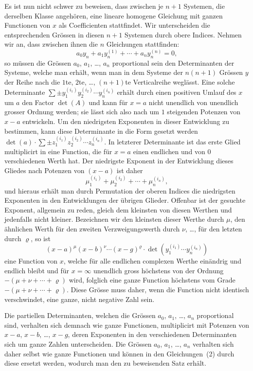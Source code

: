 \documentclass[12pt,a4paper]{article}
\begin{document}
Es ist nun nicht schwer zu beweisen, dass zwischen je $n+1$ Systemen, die derselben Klasse angeh\"oren, eine lineare homogene Gleichung mit ganzen Functionen von $x$ als Coefficienten stattfindet. Wir unterscheiden die entsprechenden Gr\"ossen in diesen $n+1$ Systemen durch obere Indices. Nehmen wir an, dass zwischen ihnen die $n$ Gleichungen stattfinden:
\[
a_0 y_n + a_1 y_n^{(1)} + \cdots + a_n y_n^{(n)} = 0,
\]
so m\"ussen die Gr\"ossen $a_0$, $a_1$, \ldots, $a_n$ proportional sein den Determinanten der Systeme, welche man erh\"alt, wenn man in dem Systeme der $n(n+1)$ Gr\"ossen $y$ der Reihe nach die $1$te, $2$te, \ldots, $(n+1)$te Verticalreihe wegl\"asst. Eine solche Determinante $\sum \pm y_1^{(i_1)} y_2^{(i_2)} \cdots y_n^{(i_n)}$ erh\"alt durch einen positiven Umlauf des $x$ um $a$ den Factor $\det(A)$ und kann f\"ur $x=a$ nicht unendlich von unendlich grosser Ordnung werden; sie l\"asst sich also nach um $1$ steigenden Potenzen von $x-a$ entwickeln. Um den niedrigsten Exponenten in dieser Entwicklung zu bestimmen, kann diese Determinante in die Form gesetzt werden $\det(a) \cdot \sum \pm z_1^{(i_1)} z_2^{(i_2)} \cdots z_n^{(i_n)}$. In letzterer Determinante ist das erste Glied multiplicirt in eine Function, die f\"ur $x=a$ einen endlichen und von $0$ verschiedenen Werth hat. Der niedrigste Exponent in der Entwicklung dieses Gliedes nach Potenzen von $(x-a)$ ist daher
\[
\mu_1^{(i_1)} + \mu_2^{(i_2)} + \cdots + \mu_n^{(i_n)},
\]
und hieraus erh\"alt man durch Permutation der oberen Indices die niedrigsten Exponenten in den Entwicklungen der \"ubrigen Glieder. Offenbar ist der gesuchte Exponent, allgemein zu reden, gleich dem kleinsten von diesen Werthen und jedenfalls nicht kleiner. Bezeichnen wir den kleinsten dieser Werthe durch $\mu$, den \"ahnlichen Werth f\"ur den zweiten Verzweigungswerth durch $\nu$, \ldots, f\"ur den letzten durch $\varrho$, so ist
\[
(x-a)^\mu(x-b)^\nu\cdots(x-g)^\varrho \cdot \det(y_1^{(i_1)} \cdots y_n^{(i_n)})
\]
eine Function von $x$, welche f\"ur alle endlichen complexen Werthe ein\"andrig und endlich bleibt und f\"ur $x=\infty$ unendlich gross h\"ochstens von der Ordnung $-(\mu+\nu+\cdots+\varrho)$ wird, folglich eine ganze Function h\"ochstens vom Grade $-(\mu+\nu+\cdots+\varrho)$. Diese Gr\"osse muss daher, wenn die Function nicht identisch verschwindet, eine ganze, nicht negative Zahl sein.

Die partiellen Determinanten, welchen die Gr\"ossen $a_0$, $a_1$, \ldots, $a_n$ proportional sind, verhalten sich demnach wie ganze Functionen, multiplicirt mit Potenzen von $x-a$, $x-b$, \ldots, $x-g$, deren Exponenten in den verschiedenen Determinanten sich um ganze Zahlen unterscheiden. Die Gr\"ossen $a_0$, $a_1$, \ldots, $a_n$ verhalten sich daher selbst wie ganze Functionen und k\"onnen in den Gleichungen~(2) durch diese ersetzt werden, wodurch man den zu beweisenden Satz erh\"alt.
\end{document}
